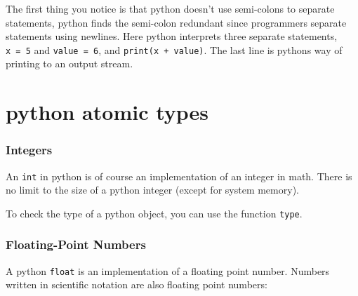 The first thing you notice is that python doesn't use semi-colons to
separate statements, python finds the semi-colon redundant since
programmers separate statements using newlines. Here python interprets
three separate statements, \texttt{x\ =\ 5} and \texttt{value\ =\ 6},
and \texttt{print(x\ +\ value)}. The last line is pythons way of
printing to an output stream.

\section{python atomic
types}\label{python-introduction.md__python-atomic-types}

\subsubsection{Integers}\label{python-introduction.md__integers}

An \texttt{int} in python is of course an implementation of an integer
in math. There is no limit to the size of a python integer (except for
system memory).

\begin{Shaded}
\begin{Highlighting}[]
 \OperatorTok{+} 
\end{Highlighting}
\end{Shaded}

To check the type of a python object, you can use the function
\texttt{type}.

\begin{Shaded}
\begin{Highlighting}[]
\NormalTok{(} \OperatorTok{+} \NormalTok{)}
\end{Highlighting}
\end{Shaded}

\begin{Shaded}
\begin{Highlighting}[]
\end{Highlighting}
\end{Shaded}

\subsubsection{Floating-Point
Numbers}\label{python-introduction.md__floating-point-numbers}

A python \texttt{float} is an implementation of a floating point number.
Numbers written in scientific notation are also floating point numbers:

